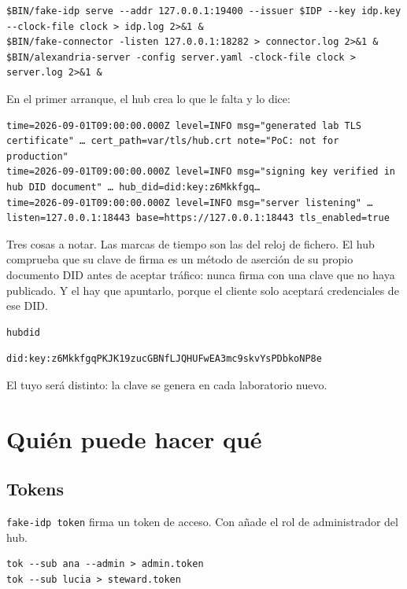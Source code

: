 \begin{lstlisting}[style=sh]
$BIN/fake-idp serve --addr 127.0.0.1:19400 --issuer $IDP --key idp.key --clock-file clock > idp.log 2>&1 &
$BIN/fake-connector -listen 127.0.0.1:18282 > connector.log 2>&1 &
$BIN/alexandria-server -config server.yaml -clock-file clock > server.log 2>&1 &
\end{lstlisting}

En el primer arranque, el hub crea lo que le falta y lo dice:

\begin{lstlisting}[style=out]
time=2026-09-01T09:00:00.000Z level=INFO msg="generated lab TLS certificate" … cert_path=var/tls/hub.crt note="PoC: not for production"
time=2026-09-01T09:00:00.000Z level=INFO msg="signing key verified in hub DID document" … hub_did=did:key:z6Mkkfgq…
time=2026-09-01T09:00:00.000Z level=INFO msg="server listening" … listen=127.0.0.1:18443 base=https://127.0.0.1:18443 tls_enabled=true
\end{lstlisting}

Tres cosas a notar. Las marcas de tiempo son las del reloj de fichero. El hub comprueba que su clave de firma
es un método de aserción de su propio documento DID antes de aceptar tráfico: nunca firma con una clave que no
haya publicado. Y el  hay que apuntarlo, porque el cliente solo aceptará credenciales de ese DID.

\begin{lstlisting}[style=sh]
hubdid
\end{lstlisting}
\begin{lstlisting}[style=out]
did:key:z6MkkfgqPKJK19zucGBNfLJQHUFwEA3mc9skvYsPDbkoNP8e
\end{lstlisting}

El tuyo será distinto: la clave se genera en cada laboratorio nuevo.

\section{Quién puede hacer qué}

\subsection{Tokens}

\texttt{fake-idp token} firma un token de acceso. Con  añade el rol de administrador del hub.

\begin{lstlisting}[style=sh]
tok --sub ana --admin > admin.token
tok --sub lucia > steward.token
\end{lstlisting}

